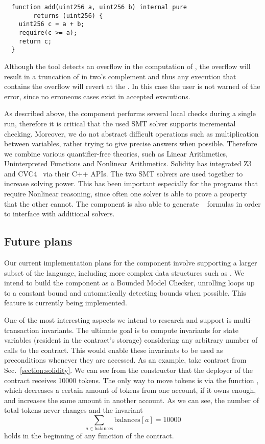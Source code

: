 \begin{verbatim}
  function add(uint256 a, uint256 b) internal pure
        returns (uint256) {
    uint256 c = a + b;
    require(c >= a);
    return c;
  }
\end{verbatim}

Although the tool detects an overflow in the computation of ,
the overflow will result in a truncation of  in two's complement and thus
any execution that contains the overflow will revert at the .
%
In this case the user is not warned of the error, since no erroneous cases
exist in accepted executions.

As described above, the component performs several local checks during a single
run, therefore it is critical that the used SMT solver supports
incremental checking.
%
Moreover, we do not abstract difficult operations such as multiplication
between variables, rather trying to give precise answers when possible.
%
Therefore we combine various quantifier-free theories, such as Linear
Arithmetics, Uninterpreted Functions and Nonlinear Arithmetics. 
%
Solidity has integrated Z3~\cite{Z3} and CVC4~\cite{CVC4} via their C++ APIs.
%
The two SMT solvers are used together to increase solving power.
%
This has been important especially for the programs that require Nonlinear
reasoning, since often one solver is able to prove a property that the other
cannot.
%
The component is also able to generate ~\cite{SMTLIB}
formulas in order to interface with additional solvers.


\subsection{Future plans}

Our current implementation plans for the component involve supporting
a larger subset of the language, including more complex data structures
such as .
%
We intend to build the component as a Bounded Model Checker, unrolling loops
up to a constant bound and automatically detecting bounds when possible.
%
This feature is currently being implemented.

One of the most interesting aspects we intend to research and support is
multi-transaction invariants.
%
The ultimate goal is to compute invariants for state variables (resident in the
contract's storage) considering any arbitrary number of calls to the contract.
%
This would enable these invariants to be used as preconditions whenever they
are accessed.
%
As an example, take contract  from Sec.~\ref{section:solidity}.
%
We can see from the constructor that the deployer of the contract receives
10000 tokens.
%
The only way to move tokens is via the function , which decreases a
certain amount of tokens from one account, if it owns enough, and increases the
same amount in another account.
%
As we can see, the number of total tokens never changes and the invariant
$$\sum_{a \in \mathrm{balances}} \mathrm{balances}[a] = 10000$$ holds in the beginning of any
function of the contract.

